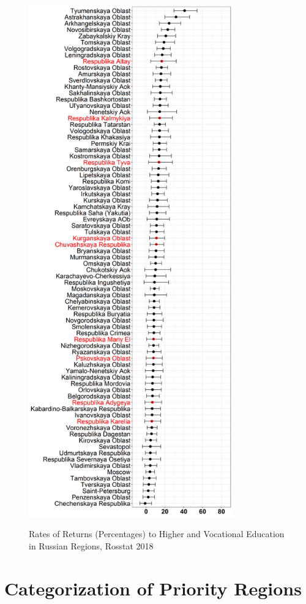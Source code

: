 \documentclass[alpha-refs]{wiley-article-03v}
\begin{document}
\begin{figure}[htp]
\begin{minipage}[b]{.5\linewidth}
		\includegraphics[width=250pt]{reg_ve_18.png}
		\label{}
	\end{minipage}
	\caption{Rates of Returns (Percentages) to Higher and Vocational Education in Russian Regions, Rosstat 2018}\label{fig:4.1}
\end{figure}



\section{Categorization of Priority Regions} 
\end{document}
